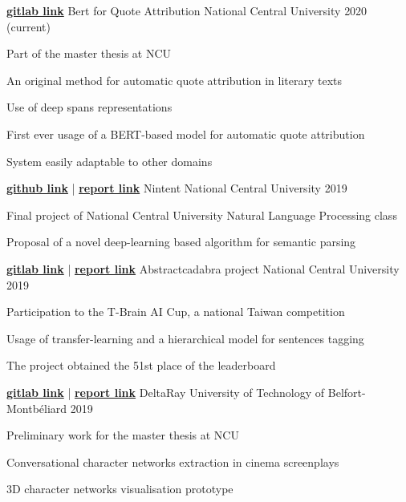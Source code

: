 \documentclass[11pt, a4paper]{awesome-cv}
\begin{document}
\begin{cventries}

  \cventry
  {\href{https://gitlab.com/Aethor/bert-quote-attribution}{\textbf{gitlab link}}}
  {Bert for Quote Attribution}
  {National Central University}
  {2020 (current)}
  {
    \begin{cvitems}
      \item Part of the master thesis at NCU
      \item An original method for automatic quote attribution in literary texts
      \item Use of deep spans representations
      \item First ever usage of a BERT-based model for automatic quote attribution
      \item System easily adaptable to other domains 
    \end{cvitems}
  }

  \cventry
  {\href{https://github.com/Aethor/nintent}{\textbf{github link}} | \href{https://drive.google.com/open?id=1UbUyf57dc8fzP_Z-UZKmebMoGD3Ei9tc}{\textbf{report link}}}
  {Nintent}
  {National Central University}
  {2019}
  {
    \begin{cvitems}
      \item Final project of National Central University Natural Language Processing class
      \item Proposal of a novel deep-learning based algorithm for semantic parsing
    \end{cvitems}
  }

  \cventry
  {\href{https://gitlab.com/Aethor/bert-quote-attribution}{\textbf{gitlab link}} | \href{https://drive.google.com/open?id=1yXpPkRviuXfG6A0qUQQn782hfrFmdzLI}{\textbf{report link}}}
  {Abstractcadabra project}
  {National Central University}
  {2019}
  {
    \begin{cvitems}
      \item Participation to the T-Brain AI Cup, a national Taiwan competition
      \item Usage of transfer-learning and a hierarchical model for sentences tagging
      \item The project obtained the 51st place of the leaderboard
    \end{cvitems}
  }

  \cventry
  {\href{https://gitlab.com/Aethor/deltaray}{\textbf{gitlab link}} | \href{https://drive.google.com/open?id=1Pek2899zQjD0A-Mq9wzFfWmRks-o3iNQ}{\textbf{report link}}}
  {DeltaRay}
  {University of Technology of Belfort-Montbéliard}
  {2019}
  {
    \begin{cvitems}
      \item Preliminary work for the master thesis at NCU
      \item Conversational character networks extraction in cinema screenplays
      \item 3D character networks visualisation prototype
    \end{cvitems}
  }


\end{cventries}
\end{document}
